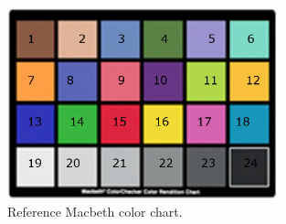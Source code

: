 \documentclass[12pt,a4paper]{article}
\begin{document}
\begin{figure}
	\centering
	\includegraphics[width=0.7\textwidth]{macbeth.png}
	\caption{Reference Macbeth color chart.}
	\label{fig:macbeth}
\end{figure}




\end{document}
